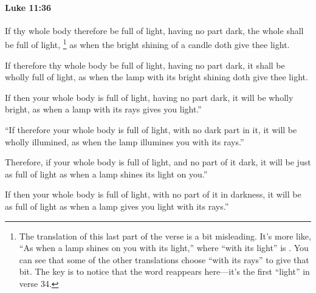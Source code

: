 		\paragraph{Luke 11:36} %
			\label{LUKE-11-36}

			If thy whole body therefore be full of light, having no part dark, the whole shall be full of light,
				\footnote{%
					The translation of this last part of the verse is a bit misleading. It's more like, ``As when a lamp shines on you with its light,'' where ``with its light'' is . You can see that some of the other translations choose ``with its rays'' to give that bit. The key is to notice that the word  reappears here---it's the first ``light'' in verse 34.
					}%
			as when the bright shining of a candle doth give thee light.

			\begin{framed}
			\scriptsize
				\begin{compactdesc}
					\item[SBLG]  \hyperref[LUCHNOS]{} 
					\item[ASV] If therefore thy whole body be full of light, having no part dark, it shall be wholly full of light, as when the lamp with its bright shining doth give thee light.
					\item[ESV] If then your whole body is full of light, having no part dark, it will be wholly bright, as when a lamp with its rays gives you light.''
					\item[NASB] ``If therefore your whole body is full of light, with no dark part in it, it will be wholly illumined, as when the lamp illumines you with its rays.''
					\item[NIV] Therefore, if your whole body is full of light, and no part of it dark, it will be just as full of light as when a lamp shines its light on you.''
					\item[NRSV] If then your whole body is full of light, with no part of it in darkness, it will be as full of light as when a lamp gives you light with its rays.''
				\end{compactdesc}
			\end{framed}

